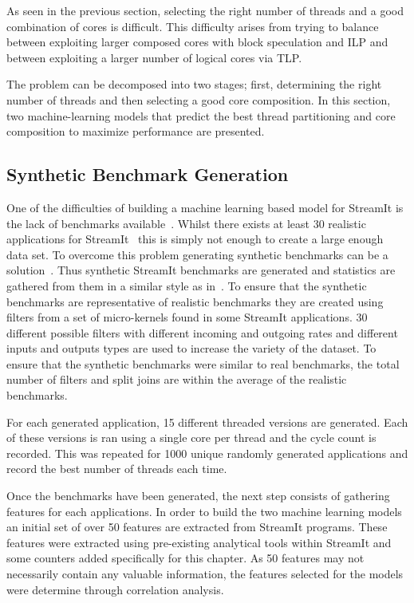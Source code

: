 As seen in the previous section, selecting the right number of threads and a good combination of cores is difficult.
This difficulty arises from trying to balance between exploiting larger composed cores with block speculation and ILP and between exploiting a larger number of logical cores via TLP.

The problem can be decomposed into two stages; first, determining the right number of threads and then selecting a good core composition.
In this section, two machine-learning models that predict the best thread partitioning and core composition to maximize performance are presented.

\subsection{Synthetic Benchmark Generation}

One of the difficulties of building a machine learning based model for StreamIt is the lack of benchmarks available~\cite{wang2013partitionstreamit}.
Whilst there exists at least 30 realistic applications for StreamIt~\cite{theis2010empericalcharstreamit} this is simply not enough to create a large enough data set.
To overcome this problem generating synthetic benchmarks can be a solution~\cite{cumminsopencl2017}.
Thus synthetic StreamIt benchmarks are generated and statistics are gathered from them in a similar style as in~\cite{wang2013partitionstreamit}.
To ensure that the synthetic benchmarks are representative of realistic benchmarks they are created using filters from a set of micro-kernels found in some StreamIt applications.
30 different possible filters with different incoming and outgoing rates and different inputs and outputs types are used to increase the variety of the dataset.
To ensure that the synthetic benchmarks were similar to real benchmarks, the total number of filters and split joins are within the average of the realistic benchmarks.

For each generated application, 15 different threaded versions are generated.
Each of these versions is ran using a single core per thread and the cycle count is recorded.
This was repeated for 1000 unique randomly generated applications and record the best number of threads each time.

Once the benchmarks have been generated, the next step consists of gathering features for each applications.
In order to build the two machine learning models an initial set of over 50 features are extracted from StreamIt programs.
These features were extracted using pre-existing analytical tools within StreamIt and some counters added specifically for this chapter.
As 50 features may not necessarily contain any valuable information, the features selected for the models were determine through correlation analysis.


